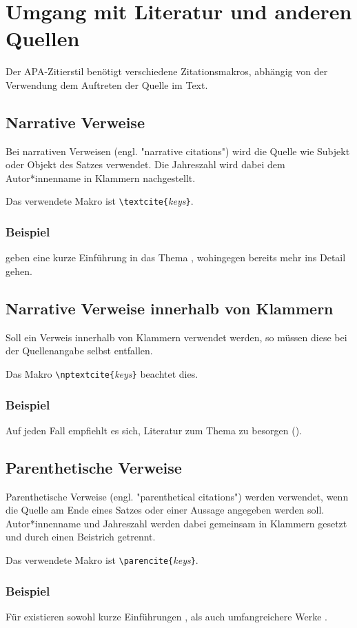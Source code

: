 \chapter[Umgang mit Literatur]{Umgang mit Literatur und anderen Quellen}
\label{cha:Literatur}

Der APA-Zitierstil benötigt verschiedene Zitationsmakros, abhängig von der Verwendung \bzw dem Auftreten der Quelle im Text.

\section{Narrative Verweise}

Bei narrativen Verweisen (engl. "narrative citations") wird die Quelle wie Subjekt oder Objekt des Satzes
verwendet. Die Jahreszahl wird dabei dem Autor*innenname in Klammern nachgestellt.

Das verwendete Makro ist \verb!\textcite{!\textit{keys}\verb!}!.

\subsection{Beispiel}

\textcite{Daniel2018} geben eine kurze Einführung in das Thema \latex, wohingegen \textcite{Oetiker2018, Kopka2003} bereits mehr ins Detail gehen.

\section{Narrative Verweise innerhalb von Klammern}

Soll ein Verweis innerhalb von Klammern verwendet werden, so müssen diese bei der Quellenangabe
selbst entfallen.

Das Makro \verb!\nptextcite{!\textit{keys}\verb!}! beachtet dies.

\subsection{Beispiel}

Auf jeden Fall empfiehlt es sich, Literatur zum Thema \latex zu besorgen (\zB {}).

\section{Parenthetische Verweise}

Parenthetische Verweise (engl. "parenthetical citations") werden verwendet, wenn die Quelle am
Ende eines Satzes oder einer Aussage angegeben werden soll. Autor*innen\-name und Jahreszahl
werden dabei gemeinsam in Klammern gesetzt und durch einen Beistrich getrennt.

Das verwendete Makro ist \verb!\parencite{!\textit{keys}\verb!}!.

\subsection{Beispiel}

Für \latex existieren sowohl kurze Einführungen \parencite{Daniel2018}, als auch umfangreichere Werke \parencite{Oetiker2018, Kopka2003}.

